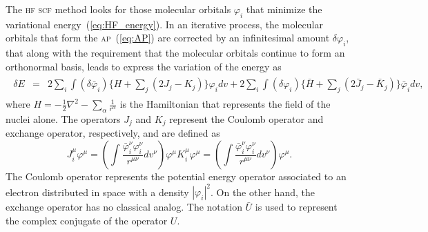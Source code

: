 The \textsc{hf} \textsc{scf} method looks for those molecular orbitals
$\varphi_{i}$ that minimize the variational
energy~(\ref{eq:HF_energy}). In an iterative process, the molecular
orbitals that form the \textsc{ap}~(\ref{eq:AP}) are corrected by an
infinitesimal amount $\delta\varphi_{i}$, that along with the
requirement that the molecular orbitals continue to form an
orthonormal basis, leads to express the variation of the energy
as~\cite{Roothaan_HF}
%
\begin{eqnarray}
  \begin{split}
    \delta E & = & 2 \sum\limits_{i} \int (\delta\bar\varphi_{i})
    \{ H + \sum\limits_{j} (2J_{j} - K_{j}) \} \varphi_{i} dv +
    2 \sum\limits_{i} \int (\delta\varphi_{i})
    \{ \bar H + \sum\limits_{j} (2\bar J_{j} - \bar K_{j}) \}
    \bar\varphi_{i} dv,
  \end{split}
  \label{eq:delta_Ehf}
\end{eqnarray}
%
where $H = -\frac{1}{2}\nabla^{2} -
\sum\limits_{\alpha}\frac{1}{r^{\alpha}}$ is the Hamiltonian that
represents the field of the nuclei alone. The operators $J_{j}$ and
$K_{j}$ represent the Coulomb operator and exchange operator,
respectively, and are defined as~\cite{Roothaan_HF}
%
\begin{subequations}
  \begin{equation}\label{eq:one_indxJ}
    J_{i}^{\mu} \varphi^{\mu} = \left( \int
    \frac{\bar\varphi_{i}^{\nu} \varphi_{i}^{\nu}}
         {r^{\mu\nu}} dv^{\nu}
         \right) \varphi^{\mu}
  \end{equation}
  \begin{equation}\label{eq:one_indxK}
    K_{i}^{\mu} \varphi^{\mu} = \left( \int
    \frac{\bar\varphi_{i}^{\nu} \varphi_{i}^{\nu}}
         {r^{\mu\nu}} dv^{\nu}
         \right) \varphi^{\mu}.
  \end{equation}
\end{subequations}
%
The Coulomb operator represents the potential energy operator
associated to an electron distributed in space with a density
$|\varphi_{i}|^{2}$. On the other hand, the exchange operator has no
classical analog. The notation $\bar U$ is used to represent the
complex conjugate of the operator $U$.

